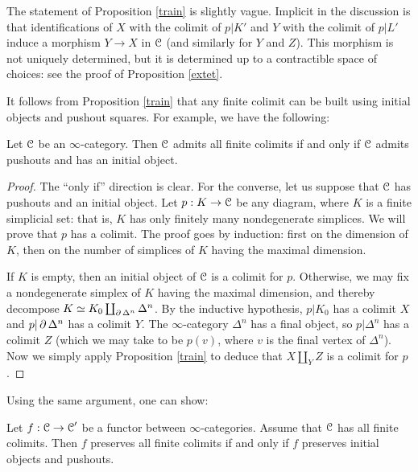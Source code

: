 \begin{remark}
The statement of Proposition \ref{train} is slightly vague.
Implicit in the discussion is that identifications of $X$ with the
colimit of $p|K'$ and $Y$ with the colimit of $p|L'$ induce a
morphism $Y \rightarrow X$ in $\operatorname{\mathcal{C}}$ (and similarly for $Y$ and $Z$).
This morphism is not uniquely determined, but it is determined up
to a contractible space of choices: see the proof of Proposition
\ref{extet}.
\end{remark}

It follows from Proposition \ref{train} that any finite colimit
can be built using initial objects and pushout squares. For example,
we have the following:

\begin{corollary}\label{allfin}
Let $\operatorname{\mathcal{C}}$ be an $\infty$-category. Then $\operatorname{\mathcal{C}}$ admits all finite colimits if
and only if $\operatorname{\mathcal{C}}$ admits pushouts and has an initial object.
\end{corollary}

\begin{proof}
The ``only if'' direction is clear. For the converse, let us
suppose that $\operatorname{\mathcal{C}}$ has pushouts and an initial object. Let $p: K
\rightarrow \operatorname{\mathcal{C}}$ be any diagram, where $K$ is a finite simplicial
set: that is, $K$ has only finitely many nondegenerate simplices.
We will prove that $p$ has a colimit. The proof goes by induction:
first on the dimension of $K$, then on the number of simplices of
$K$ having the maximal dimension.

If $K$ is empty, then an initial object of $\operatorname{\mathcal{C}}$ is a colimit for
$p$. Otherwise, we may fix a nondegenerate simplex of $K$ having
the maximal dimension, and thereby decompose $K \simeq K_0
\coprod_{ \operatorname{\partial} \Delta^n } \Delta^n$. By the inductive hypothesis,
$p|K_0$ has a colimit $X$ and $p| \operatorname{\partial} \Delta^n$ has a colimit $Y$.
The $\infty$-category $\Delta^n$ has a final object, so $p| \Delta^n$
has a colimit $Z$ (which we may take to be $p(v)$, where $v$ is
the final vertex of $\Delta^n$). Now we simply apply Proposition
\ref{train} to deduce that $X \coprod_Y Z$ is a colimit for $p$.
\end{proof}

Using the same argument, one can show:

\begin{corollary}\label{allfinn}
Let $f: \operatorname{\mathcal{C}} \rightarrow \operatorname{\mathcal{C}}'$ be a functor between $\infty$-categories. Assume
that $\operatorname{\mathcal{C}}$ has all finite colimits. Then $f$ preserves all finite
colimits if and only if $f$ preserves initial objects and pushouts.
\end{corollary}

